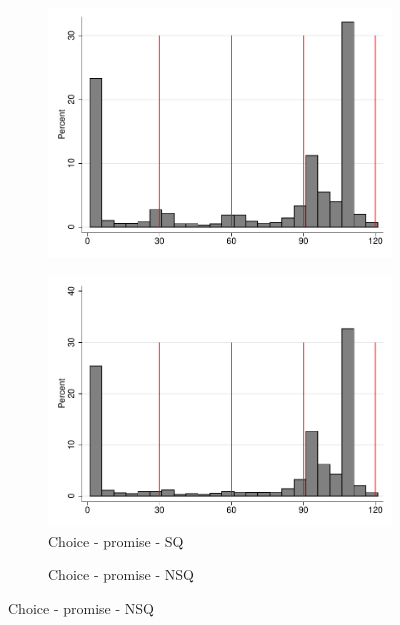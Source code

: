 \documentclass[11pt]{article}
\begin{document}
\begin{figure}[H]
\begin{center}
\begin{subfigure}{.31\textwidth}
        \includegraphics[width=\textwidth]{Figuras/hist_payments_pro_5.pdf}
    \end{subfigure}  
     \begin{subfigure}{.31\textwidth}
    \caption{Choice - promise - SQ}
        \centering
        \includegraphics[width=\textwidth]{Figuras/hist_payments_pro_8.pdf}
    \end{subfigure}    
     \begin{subfigure}{.31\textwidth}
    \caption{Choice - promise - NSQ}
        \centering

\end{subfigure}
\end{center}
\end{figure}
\end{document}
